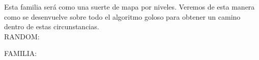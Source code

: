Esta familia será como una suerte de mapa por niveles. Veremos de esta manera como se desenvuelve sobre todo el algoritmo goloso para obtener un camino dentro de estas circunstancias.\\

RANDOM:

\begin{figure} [!ht]
 \centering
       \label{fig:randomexacto}
    \label{fig:randomgoloso}
    \end{figure}
    
    FAMILIA:
   \begin{figure} [!ht]
 \centering
       \label{fig:randomexacto}
    \label{fig:randomgoloso}
    \end{figure}
  
  